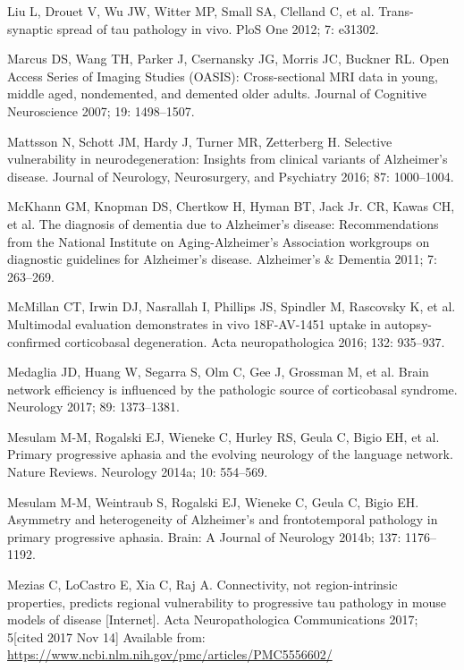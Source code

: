 \documentclass[]{article}
\begin{document}
\hypertarget{ref-liu_trans-synaptic_2012}{}
Liu L, Drouet V, Wu JW, Witter MP, Small SA, Clelland C, et al.
Trans-synaptic spread of tau pathology in vivo. PloS One 2012; 7:
e31302.

\hypertarget{ref-marcus_open_2007}{}
Marcus DS, Wang TH, Parker J, Csernansky JG, Morris JC, Buckner RL. Open
Access Series of Imaging Studies (OASIS): Cross-sectional MRI data in
young, middle aged, nondemented, and demented older adults. Journal of
Cognitive Neuroscience 2007; 19: 1498--1507.

\hypertarget{ref-mattsson_selective_2016}{}
Mattsson N, Schott JM, Hardy J, Turner MR, Zetterberg H. Selective
vulnerability in neurodegeneration: Insights from clinical variants of
Alzheimer's disease. Journal of Neurology, Neurosurgery, and Psychiatry
2016; 87: 1000--1004.

\hypertarget{ref-mckhann_diagnosis_2011}{}
McKhann GM, Knopman DS, Chertkow H, Hyman BT, Jack Jr. CR, Kawas CH, et
al. The diagnosis of dementia due to Alzheimer's disease:
Recommendations from the National Institute on Aging-Alzheimer's
Association workgroups on diagnostic guidelines for Alzheimer's disease.
Alzheimer's \& Dementia 2011; 7: 263--269.

\hypertarget{ref-mcmillan_multimodal_2016}{}
McMillan CT, Irwin DJ, Nasrallah I, Phillips JS, Spindler M, Rascovsky
K, et al. Multimodal evaluation demonstrates in vivo 18F-AV-1451 uptake
in autopsy-confirmed corticobasal degeneration. Acta neuropathologica
2016; 132: 935--937.

\hypertarget{ref-medaglia_brain_2017}{}
Medaglia JD, Huang W, Segarra S, Olm C, Gee J, Grossman M, et al. Brain
network efficiency is influenced by the pathologic source of
corticobasal syndrome. Neurology 2017; 89: 1373--1381.

\hypertarget{ref-mesulam_primary_2014}{}
Mesulam M-M, Rogalski EJ, Wieneke C, Hurley RS, Geula C, Bigio EH, et
al. Primary progressive aphasia and the evolving neurology of the
language network. Nature Reviews. Neurology 2014a; 10: 554--569.

\hypertarget{ref-mesulam_asymmetry_2014}{}
Mesulam M-M, Weintraub S, Rogalski EJ, Wieneke C, Geula C, Bigio EH.
Asymmetry and heterogeneity of Alzheimer's and frontotemporal pathology
in primary progressive aphasia. Brain: A Journal of Neurology 2014b;
137: 1176--1192.

\hypertarget{ref-mezias_connectivity_2017}{}
Mezias C, LoCastro E, Xia C, Raj A. Connectivity, not region-intrinsic
properties, predicts regional vulnerability to progressive tau pathology
in mouse models of disease {[}Internet{]}. Acta Neuropathologica
Communications 2017; 5{[}cited 2017 Nov 14{]} Available from:
\url{https://www.ncbi.nlm.nih.gov/pmc/articles/PMC5556602/}
\end{document}
